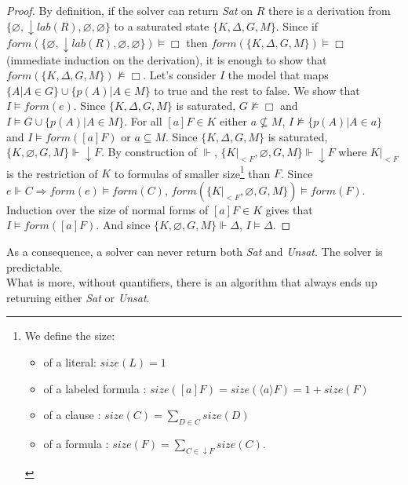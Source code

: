 \documentclass[a4paper,11pt]{article}
\newcommand{\F}{\mathit{form}}
\newcommand{\T}{\mathit{lab}}
\newcommand{\Si}{\mathit{size}}
\begin{document}
\begin{proof}
By definition, if the solver can return \emph{Sat} on $R$ there is a derivation from
$\{\varnothing,\downarrow\T(R),\varnothing,\varnothing\}$ to a saturated state $\{K,\Delta,G,M\}$. Since
if $\F(\{\varnothing,\downarrow\T(R),\varnothing,\varnothing\})\vDash\Box$ then
$\F(\{K,\Delta,G,M\})\vDash\Box$ (immediate induction on the derivation), it is enough to show that
$\F(\{K,\Delta,G,M\})\nvDash\Box$.
Let's consider $I$ the model that maps $\{A|A\in G\}\cup\{p(A)|A\in M\}$ to true and the rest to false.
We show that $I\vDash\F(e)$. Since $\{K,\Delta,G,M\}$ is saturated, $G\nvDash\Box$ and
$I\vDash G\cup\{p(A)|A\in M\}$. For all $[a]F\in K$ either $a\nsubseteq M$, $I\nvDash\{p(A)|A\in a\}$
and $I\vDash\F([a]F)$ or $a\subseteq M$. Since $\{K,\Delta,G,M\}$ is saturated,
$\{K,\varnothing,G,M\}\Vdash\downarrow F$. By construction of $\Vdash$, $\{K|_{<F},\varnothing,G,M\}
\Vdash\downarrow F$ where
$K|_{<F}$ is the restriction of $K$ to formulas of smaller size\footnote{
We define the size:
\begin{itemize}
 \item of a literal: $\Si(L)=1$
 \item of a labeled formula : $\Si([a]F)=\Si(\langle a\rangle F)=1+\Si(F)$
 \item of a clause : $\Si(C)=\sum_{D\in C}\Si(D)$
 \item of a formula : $\Si(F)=\sum_{C\in\downarrow F}\Si(C)$.
\end{itemize}}
than $F$. Since $e\Vdash C\Rightarrow\F(e)\vDash\F(C)$,
$\F(\{K|_{<F},\varnothing,G,M\})\vDash\F(F)$. Induction over
the size of normal forms of $[a]F\in K$ gives that $I\vDash\F([a]F)$.
And since $\{K,\varnothing,G,M\}\Vdash\Delta$, $I\vDash\Delta$.
\end{proof}

As a consequence, a solver can never return both \emph{Sat} and \emph{Unsat}.
{\corollary The solver is predictable.}\\
What is more, without quantifiers, there is an algorithm that always ends up returning either \emph{Sat}
or \emph{Unsat}.
\end{document}
